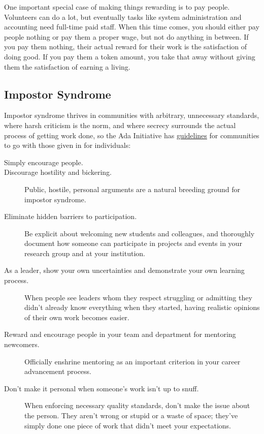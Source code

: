 One important special case of making things rewarding is to pay
people.  Volunteers can do a lot, but eventually tasks like system
administration and accounting need full-time paid staff.  When this
time comes, you should either pay people nothing or pay them a proper
wage, but not do anything in between.  If you pay them nothing, their
actual reward for their work is the satisfaction of doing good.  If
you pay them a token amount, you take that away without giving them
the satisfaction of earning a living.

\subsection*{Impostor Syndrome}

Impostor syndrome thrives in communities with arbitrary, unnecessary
standards, where harsh criticism is the norm, and where secrecy
surrounds the actual process of getting work done, so the Ada
Initiative has
\href{https://www.usenix.org/blog/impostor-syndrome-proof-yourself-and-your-community}{guidelines}
for communities to go with those given in
for individuals:

\begin{description}

\item[Simply encourage people.]

\item[Discourage hostility and bickering.] Public, hostile, personal
  arguments are a natural breeding ground for impostor syndrome.

\item[Eliminate hidden barriers to participation.] Be explicit about
  welcoming new students and colleagues, and thoroughly document how
  someone can participate in projects and events in your research
  group and at your institution.

\item[As a leader, show your own uncertainties and demonstrate your
  own learning process.] When people see leaders whom they respect
  struggling or admitting they didn't already know everything when
  they started, having realistic opinions of their own work becomes
  easier.

\item[Reward and encourage people in your team and department for
  mentoring newcomers.] Officially enshrine mentoring as an important
  criterion in your career advancement process.

\item[Don't make it personal when someone's work isn't up to snuff.]
  When enforcing necessary quality standards, don't make the issue
  about the person. They aren't wrong or stupid or a waste of space;
  they've simply done one piece of work that didn't meet your
  expectations.

\end{description}

